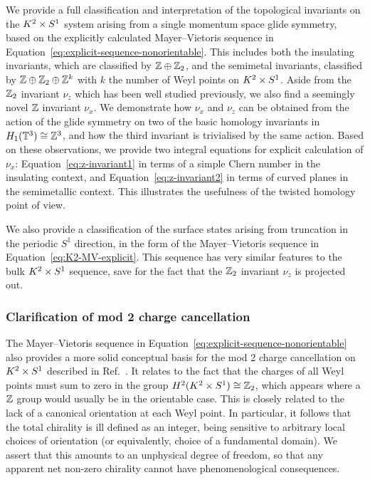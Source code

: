 We provide a full classification and interpretation of the topological invariants on the $K^2\times S^1$ system arising from a single momentum space glide symmetry, based on the explicitly calculated Mayer--Vietoris sequence in Equation~\eqref{eq:explicit-sequence-nonorientable}. This includes both the insulating invariants, which are classified by $\mathbb{Z}\oplus\mathbb{Z}_2$, and the semimetal invariants, classified by $\mathbb{Z}\oplus\mathbb{Z}_2\oplus\mathbb{Z}^k$ with $k$ the number of Weyl points on $K^2\times S^1$. Aside from the $\mathbb{Z}_2$ invariant $\nu_z$ which has been well studied previously, we also find a seemingly novel $\mathbb{Z}$ invariant $\nu_x$. We demonstrate how $\nu_x$ and $\nu_z$ can be obtained from the action of the glide symmetry on two of the basic homology invariants in $H_1(\mathbb{T}^3)\cong\mathbb{Z}^3$, and how the third invariant is trivialised by the same action. Based on these observations, we provide two integral equations for explicit calculation of $\nu_x$: Equation~\eqref{eq:z-invariant1} in terms of a simple Chern number in the insulating context, and Equation~\eqref{eq:z-invariant2} in terms of curved planes in the semimetallic context. This illustrates the usefulness of the twisted homology point of view.

We also provide a classification of the surface states arising from truncation in the periodic $S^1$ direction, in the form of the Mayer--Vietoris sequence in Equation~\eqref{eq:K2-MV-explicit}. This sequence has very similar features to the bulk $K^2\times S^1$ sequence, save for the fact that the $\mathbb{Z}_2$ invariant $\nu_z$ is projected out.

\subsubsection{Clarification of mod 2 charge cancellation}

The Mayer--Vietoris sequence in Equation~\eqref{eq:explicit-sequence-nonorientable} also provides a more solid conceptual basis for the mod 2 charge cancellation on $K^2\times S^1$ described in Ref.~\cite{Fonseca-Vaidya_nonorientable}. It relates to the fact that the charges of all Weyl points must sum to zero in the group $H^2(K^2\times S^1)\cong\mathbb{Z}_2$, which appears where a $\mathbb{Z}$ group would usually be in the orientable case. This is closely related to the lack of a canonical orientation at each Weyl point. In particular, it follows that the total chirality is ill defined as an integer, being sensitive to arbitrary local choices of orientation (or equivalently, choice of a fundamental domain). We assert that this amounts to an unphysical degree of freedom, so that any apparent net non-zero chirality cannot have phenomenological consequences.

